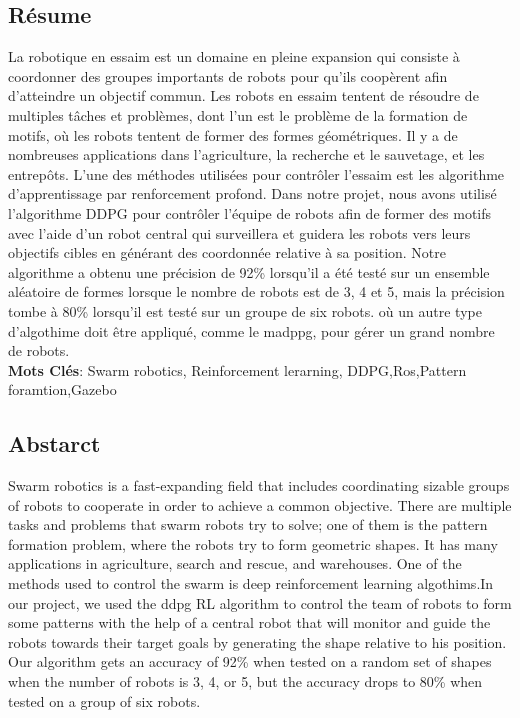 \documentclass[12pt]{extarticle}
\begin{document}
\newpage
\pagebreak
\hspace{0pt}
\vfill
\begin{center}
\section{Résume}
\end{center}
\vfill
\hspace{0pt}
\pagebreak



La robotique en essaim est un domaine en pleine expansion qui consiste à coordonner des groupes importants de robots pour qu'ils coopèrent afin d'atteindre un objectif commun. Les robots en essaim tentent de résoudre de multiples tâches et problèmes, dont l'un est le problème de la formation de motifs, où les robots tentent de former des formes géométriques. Il y a de nombreuses applications dans l'agriculture, la recherche et le sauvetage, et les entrepôts. L'une des méthodes utilisées pour contrôler l'essaim est les algorithme d'apprentissage par renforcement profond. Dans notre projet, nous avons utilisé l'algorithme DDPG pour contrôler l'équipe de robots afin de former des motifs avec l'aide d'un robot central qui surveillera et guidera les robots vers leurs objectifs cibles en générant des 
coordonnée  relative à sa position. Notre algorithme a obtenu  une précision de 92\% lorsqu'il a été testé sur un ensemble aléatoire de formes lorsque le nombre de robots est de 3, 4 et 5, mais la précision tombe à 80\% lorsqu'il est testé sur un groupe de six robots. où un autre type d'algothime doit être appliqué, comme le madppg, pour gérer un grand nombre de robots.\\


\textbf{Mots Clés}: Swarm robotics, Reinforcement lerarning, DDPG,Ros,Pattern foramtion,Gazebo


\newpage
\pagebreak
\hspace{0pt}
\vfill
\begin{center}
\section{Abstarct}
\end{center}
\vfill
\hspace{0pt}
\pagebreak


Swarm robotics is a fast-expanding field that includes coordinating sizable groups of robots to cooperate in order to achieve a common objective. There are multiple tasks and problems that swarm robots try to solve; one of them is the pattern formation problem, where the robots try to form geometric shapes. It has many applications in agriculture, search and rescue, and warehouses. One of the methods used to control the swarm is deep reinforcement learning algothims.In our project, we used the ddpg RL algorithm to control the team of robots to form some patterns with the help of a central robot that will monitor and guide the robots towards their target goals by generating the shape relative to his position. Our algorithm gets an accuracy of 92\% when tested on a random set of shapes when the number of robots is 3, 4, or 5, but the accuracy drops to 80\% when tested on a group of six robots.\\
\end{document}
